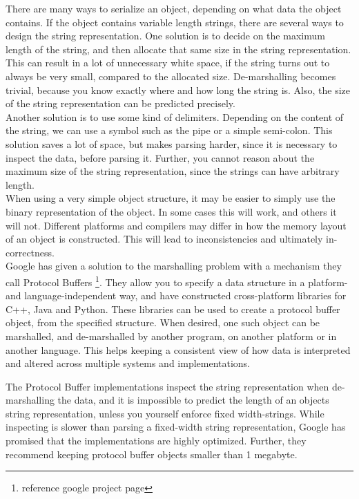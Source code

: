 \documentclass[a4paper]{article}
\begin{document}
There are many ways to serialize an object, depending on what data the object contains. If the object contains variable length strings, there are several ways to design the string representation. One solution is to decide on the maximum length of the string, and then allocate that same size in the string representation. This can result in a lot of unnecessary white space, if the string turns out to always be very small, compared to the allocated size. De-marshalling becomes trivial, because you know exactly where and how long the string is. Also, the size of the string representation can be predicted precisely.\\

Another solution is to use some kind of delimiters. Depending on the content of the string, we can use a symbol such as the pipe or a simple semi-colon. This solution saves a lot of space, but makes parsing harder, since it is necessary to inspect the data, before parsing it. Further, you cannot reason about the maximum size of the string representation, since the strings can have arbitrary length.\\

When using a very simple object structure, it may be easier to simply use the binary representation of the object. In some cases this will work, and others it will not. Different platforms and compilers may differ in how the memory layout of an object is constructed. This will lead to inconsistencies and ultimately in-correctness.\\

Google has given a solution to the marshalling problem with a mechanism they call Protocol Buffers \footnote{reference google project page}. They allow you to specify a data structure in a platform- and language-independent way, and have constructed cross-platform libraries for C++, Java and Python. These libraries can be used to create a protocol buffer object, from the specified structure. When desired, one such object can be marshalled, and de-marshalled by another program, on another platform or in another language. This helps keeping a consistent view of how data is interpreted and altered across multiple systems and implementations.

The Protocol Buffer implementations inspect the string representation when de-marshalling the data, and it is impossible to predict the length of an objects string representation, unless you yourself enforce fixed width-strings. While inspecting is slower than parsing a fixed-width string representation, Google has promised that the implementations are highly optimized. Further, they recommend keeping protocol buffer objects smaller than 1 megabyte.\\
\end{document}
